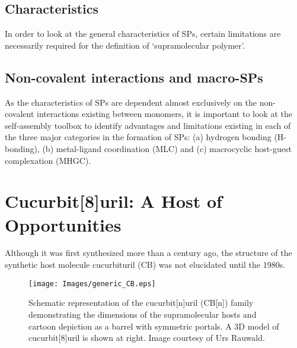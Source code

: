 \documentclass[a4paper,12pt]{report} %
\begin{document}

\subsection{Characteristics}
\noindent
In order to look at the general characteristics of SPs, certain limitations are necessarily required for the definition of `supramolecular polymer'. 





\subsection{Non-covalent interactions and macro-SPs}
\noindent
As the characteristics of SPs are dependent almost exclusively on the non-covalent interactions existing between monomers, it is important to look at the self-assembly toolbox to identify advantages and limitations existing in each of the three major categories in the formation of SPs: (a) hydrogen bonding (H-bonding), (b) metal-ligand coordination (MLC) and (c) macrocyclic host-guest complexation (MHGC).


\section{Cucurbit[8]uril: A Host of Opportunities}
\noindent
Although it was first synthesized more than a century ago,\cite{Behrend:1905p1004} the structure of the synthetic host molecule cucurbituril (CB) was not elucidated until the 1980s.\cite{Freeman:1981p990}

\vspace{0.25 in}
\begin{figure}[h]
\begin{center}
 \texttt{[image: Images/generic\_CB.eps]}
\vspace{0.1 in}
  \caption{Schematic representation of the cucurbit[n]uril (CB[n]) family demonstrating the dimensions of the supramolecular hosts and cartoon depiction as a barrel with symmetric portals. A 3D model of cucurbit[8]uril is shown at right. Image courtesy of Urs Rauwald.}\label{generic_CB}
\end{center}
\vspace{0.25 in}
\end{figure} 


\end{document}
